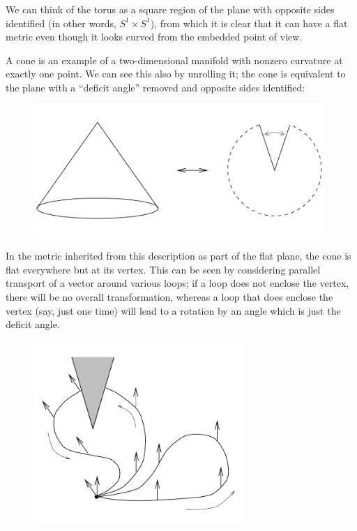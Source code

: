 \documentclass[12pt]{article}
\begin{document}
\noindent We can think of the torus as a square region of the plane
with opposite sides identified (in other words, $S^1\times S^1$),
from which it is clear that it can have a flat metric even though
it looks curved from the embedded point of view.

A cone is an example of a two-dimensional manifold with nonzero
curvature at exactly one point.  We can see this also by unrolling
it; the cone is equivalent to the plane with a ``deficit angle''
removed and opposite sides identified:

\eject

\begin{figure}[h]
  \centerline{
  \includegraphics[height=5cm]{pdf/three11}}
\end{figure}

\noindent In the metric inherited from this description as part of the 
flat plane, the cone is flat everywhere but at its vertex.  This can
be seen by considering parallel transport of a vector around various
loops; if a loop does not enclose the vertex, there will be no overall
transformation, whereas a loop that does enclose the vertex (say, just
one time) will lead to a rotation by an angle which is just the
deficit angle.

\begin{figure}[h]
  \centerline{
  \includegraphics[height=7cm]{pdf/three12}}
\end{figure}
\end{document}
